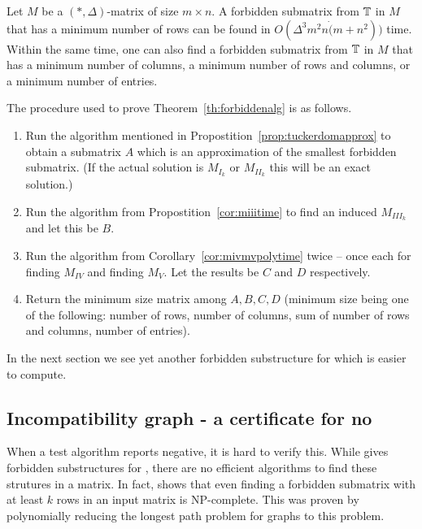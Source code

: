 \begin{theoremsansproof}
  \label{th:forbiddenalg}
  Let $M$ be a $(*,\Delta)$-matrix of size $m \times n$. A forbidden
  submatrix from $\mathbb{T}$ in $M$ that has a minimum number of rows
  can be found in $O(\Delta^3m^2n\dot(m+n^2))$ time. Within the same
  time, one can also find a forbidden submatrix from $\mathbb{T}$ in
  $M$ that has a minimum number of columns, a minimum number of rows
  and columns, or a minimum number of entries.
\end{theoremsansproof}

The procedure used to prove Theorem~\ref{th:forbiddenalg} is as
follows. 
\begin{enumerate}
\item Run the algorithm mentioned in
  Propostition~\ref{prop:tuckerdomapprox} to obtain a submatrix $A$
  which is an approximation of the smallest forbidden submatrix. (If
  the actual solution is $M_{I_k}$ or $M_{II_k}$ this will be an exact
  solution.)
\item Run the algorithm from Propostition~\ref{cor:miiitime} to find
  an induced $M_{III_k}$ and let this be $B$.
\item Run the algorithm from Corollary~\ref{cor:mivmvpolytime} twice
  -- once each for finding $M_{IV}$ and finding $M_{V}$. Let the
  results be $C$ and $D$ respectively.
\item Return the minimum size matrix among $A, B, C, D$ (minimum size
  being one of the following: number of rows, number of columns, sum
  of number of rows and columns, number of {\un} entries).
\end{enumerate}

In the next section we see yet another forbidden substructure for
\COP which is easier to compute.

\subsection{Incompatibility graph - a certificate for no \COP}
\label{sec:incompatibilitygr}

When a \COP test algorithm reports negative, it is hard to verify
this. While \cite{at72} gives forbidden substructures for \COP, there
are no efficient algorithms to find these strutures in a matrix. In
fact, \cite{v82} shows that even finding a forbidden submatrix with at
least $k$ rows in an input matrix is NP-complete. This was proven by
polynomially reducing the longest path problem for graphs to this
problem.

